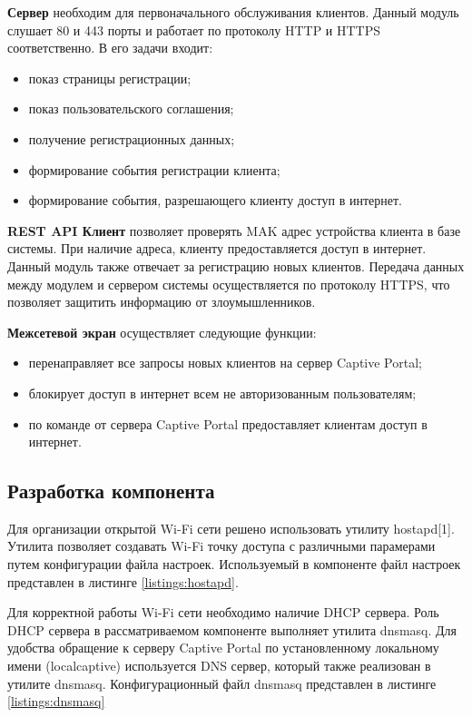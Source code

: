 \textbf{Сервер} необходим для первоначального обслуживания клиентов. Данный модуль слушает 80 и 443 порты и работает по протоколу HTTP и HTTPS соответственно. В его задачи входит:

\begin{itemize}
	\item показ страницы регистрации;
	\item показ пользовательского соглашения;
	\item получение регистрационных данных;
	\item формирование события регистрации клиента;
	\item формирование события, разрешающего клиенту доступ в интернет.
\end{itemize}

\textbf{REST API Клиент} позволяет проверять MAK адрес устройства клиента в базе системы. При наличие адреса, клиенту предоставляется доступ в интернет. Данный модуль также отвечает за регистрацию новых клиентов. Передача данных между модулем и сервером системы осуществляется по протоколу HTTPS, что позволяет защитить информацию от злоумышленников.

\textbf{Межсетевой экран} осуществляет следующие функции:
\begin{itemize}
	\item перенаправляет все запросы новых клиентов на сервер Captive Portal;
	\item блокирует доступ в интернет всем не авторизованным пользователям;
	\item по команде от сервера Captive Portal предоставляет клиентам доступ в интернет.
\end{itemize}

\subsection{Разработка компонента}

Для организации открытой Wi-Fi сети решено использовать утилиту hostapd[1]. Утилита позволяет создавать Wi-Fi точку доступа с различными парамерами путем конфигурации файла настроек. Используемый в компоненте файл настроек представлен в листинге \ref{listings:hostapd}.

Для корректной работы Wi-Fi сети необходимо наличие DHCP сервера. Роль DHCP сервера в рассматриваемом компоненте выполняет утилита dnsmasq. Для удобства обращение к серверу Captive Portal по установленному локальному имени (localcaptive) используется DNS сервер, который также реализован в утилите dnsmasq. Конфигурационный файл dnsmasq представлен в листинге \ref{listings:dnsmasq}

